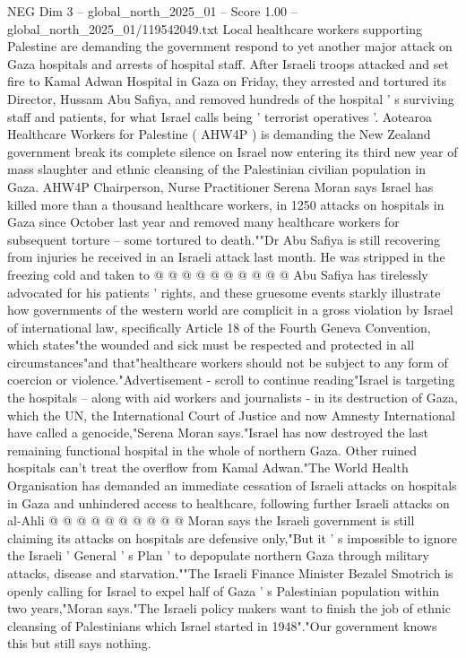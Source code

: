 \begin{textsample}{NEG Dim 3 – global\_north\_2025\_01 – Score 1.00 – global\_north\_2025\_01/119542049.txt}  \label{ex:f3_neg_220}
Local healthcare workers supporting Palestine are demanding the government respond to yet another major attack on Gaza hospitals and arrests of hospital staff.
After Israeli troops attacked and set fire to Kamal Adwan Hospital in Gaza on Friday, they arrested and tortured its Director, Hussam Abu Safiya, and removed hundreds of the hospital ' s surviving staff and patients, for what Israel calls being ' terrorist operatives '.
Aotearoa Healthcare Workers for Palestine ( AHW4P ) is demanding the New Zealand government break its complete silence on Israel now entering its third new year of mass slaughter and ethnic cleansing of the Palestinian civilian population in Gaza.
AHW4P Chairperson, Nurse Practitioner Serena Moran says Israel has killed more than a thousand healthcare workers, in 1250 attacks on hospitals in Gaza since October last year and removed many healthcare workers for subsequent torture -- some tortured to death.""Dr Abu Safiya is still recovering from injuries he received in an Israeli attack last month.
He was stripped in the freezing cold and taken to @ @ @ @ @ @ @ @ @ @ Abu Safiya has tirelessly advocated for his patients ' rights, and these gruesome events starkly illustrate how governments of the western world are complicit in a gross violation by Israel of international law, specifically Article 18 of the Fourth Geneva Convention, which states"the wounded and sick must be respected and protected in all circumstances"and that"healthcare workers should not be subject to any form of coercion or violence."Advertisement - scroll to continue reading"Israel is targeting the hospitals -- along with aid workers and journalists - in its destruction of Gaza, which the UN, the International Court of Justice and now Amnesty International have called a genocide,"Serena Moran says."Israel has now destroyed the last remaining functional hospital in the whole of northern Gaza.
Other ruined hospitals can't treat the overflow from Kamal Adwan."The World Health Organisation has demanded an immediate cessation of Israeli attacks on hospitals in Gaza and unhindered access to healthcare, following further Israeli attacks on al-Ahli @ @ @ @ @ @ @ @ @ @ Moran says the Israeli government is still claiming its attacks on hospitals are defensive only,"But it ' s impossible to ignore the Israeli ' General ' s Plan ' to depopulate northern Gaza through military attacks, disease and starvation.""The Israeli Finance Minister Bezalel Smotrich is openly calling for Israel to expel half of Gaza ' s Palestinian population within two years,"Moran says."The Israeli policy makers want to finish the job of ethnic cleansing of Palestinians which Israel started in 1948"."Our government knows this but still says nothing.

\end{textsample}
